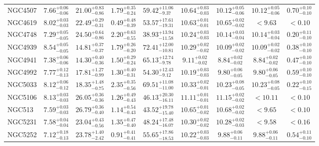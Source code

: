 \documentclass[onecolumn]{mn2e}
\begin{document}
{\begin{center}
\begin{longtable}{lcccccccc}
NGC4507 & $7.66_{-0.06}^{+0.06}$ & $21.00_{-0.86}^{+0.83}$ & $1.79_{-0.24}^{+0.35}$ &$59.42_{-9.37}^{+11.06}$ & $10.64_{-0.03}^{+0.03}$ & $10.12_{-0.06}^{+0.05}$ & $10.12_{-0.06}^{+0.05}$ & $0.70_{-0.10}^{+0.10}$ \\
NGC4619 & $8.02_{-0.03}^{+0.03}$ & $22.49_{-0.31}^{+0.29}$ & $0.49_{-0.39}^{+0.48}$ &$53.57_{-19.31}^{+17.61}$ & $10.63_{-0.01}^{+0.01}$ & $10.65_{-0.02}^{+0.02}$ & $<9.63$ & $<0.10$ \\
NGC4748 & $7.29_{-0.05}^{+0.05}$ & $24.50_{-0.86}^{+0.64}$ & $2.20_{-0.55}^{+0.63}$ &$38.93_{-11.58}^{+13.94}$ & $10.24_{-0.03}^{+0.03}$ & $10.14_{-0.04}^{+0.03}$ & $10.14_{-0.04}^{+0.03}$ & $0.20_{-0.10}^{+0.11}$ \\
NGC4939 & $8.54_{-0.05}^{+0.05}$ & $14.81_{-0.37}^{+0.37}$ & $1.79_{-0.20}^{+0.26}$ &$72.41_{-10.81}^{+12.00}$ & $10.29_{-0.02}^{+0.02}$ & $10.09_{-0.02}^{+0.02}$ & $10.09_{-0.02}^{+0.02}$ & $0.38_{-0.10}^{+0.10}$ \\
NGC4941 & $7.38_{-0.06}^{+0.06}$ & $14.30_{-0.36}^{+0.40}$ & $1.50_{-0.24}^{+0.29}$ &$65.13_{-9.78}^{+12.74}$ & $9.11_{-0.02}^{+0.02}$ & $8.84_{-0.02}^{+0.02}$ & $8.84_{-0.02}^{+0.02}$ & $0.47_{-0.10}^{+0.10}$ \\
NGC4992 & $7.77_{-0.13}^{+0.12}$ & $17.81_{-0.99}^{+1.27}$ & $1.30_{-0.31}^{+0.40}$ &$54.30_{-9.12}^{+12.43}$ & $10.19_{-0.03}^{+0.03}$ & $9.80_{-0.05}^{+0.06}$ & $9.80_{-0.05}^{+0.06}$ & $0.59_{-0.10}^{+0.10}$ \\
NGC5033 & $8.12_{-0.12}^{+0.06}$ & $18.35_{-0.75}^{+1.48}$ & $2.35_{-0.56}^{+0.35}$ &$69.51_{-11.00}^{+11.08}$ & $10.33_{-0.01}^{+0.02}$ & $10.23_{-0.05}^{+0.08}$ & $10.23_{-0.05}^{+0.08}$ & $0.22_{-0.15}^{+0.10}$ \\
NGC5106 & $8.13_{-0.03}^{+0.03}$ & $26.05_{-0.36}^{+0.36}$ & $1.26_{-0.43}^{+0.49}$ &$46.13_{-16.11}^{+20.30}$ & $11.11_{-0.01}^{+0.01}$ & $11.15_{-0.02}^{+0.02}$ & $<10.11$ & $<0.10$ \\
NGC513 & $7.59_{-0.03}^{+0.03}$ & $26.79_{-0.40}^{+0.36}$ & $1.14_{-0.43}^{+0.54}$ &$43.52_{-15.40}^{+19.78}$ & $10.65_{-0.02}^{+0.01}$ & $10.68_{-0.02}^{+0.02}$ & $<9.65$ & $<0.10$ \\
NGC5231 & $7.58_{-0.04}^{+0.04}$ & $23.04_{-0.56}^{+0.43}$ & $1.35_{-0.40}^{+0.47}$ &$48.24_{-16.07}^{+17.48}$ & $10.30_{-0.02}^{+0.02}$ & $10.28_{-0.03}^{+0.02}$ & $<9.58$ & $<0.16$ \\
NGC5252 & $7.12_{-0.13}^{+0.18}$ & $23.78_{-2.42}^{+1.40}$ & $0.91_{-0.41}^{+0.41}$ &$55.65_{-18.53}^{+17.86}$ & $10.22_{-0.03}^{+0.03}$ & $9.88_{-0.11}^{+0.06}$ & $9.88_{-0.11}^{+0.06}$ & $0.54_{-0.10}^{+0.11}$ \\

\end{longtable}
\end{center}}
\end{document}
